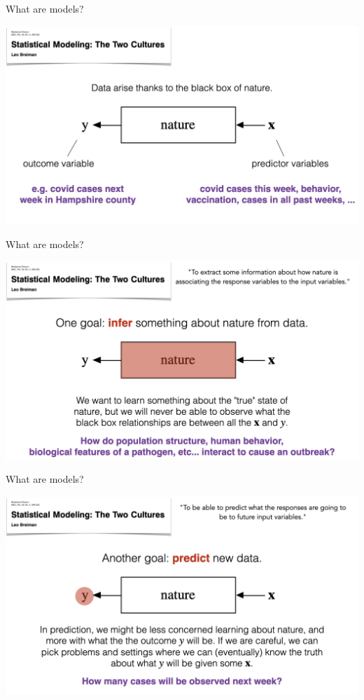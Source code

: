 \documentclass[table]{beamer}\usepackage[]{graphicx}\usepackage[]{color}
\begin{document}
\begin{frame}{What are models?}

\includegraphics[width=\textwidth]{figure-static/models1.jpeg}

\end{frame}

\begin{frame}{What are models?}

\includegraphics[width=\textwidth]{figure-static/models2.jpeg}

\end{frame}

\begin{frame}{What are models?}

\includegraphics[width=\textwidth]{figure-static/models3.jpeg}

\end{frame}
\end{document}
